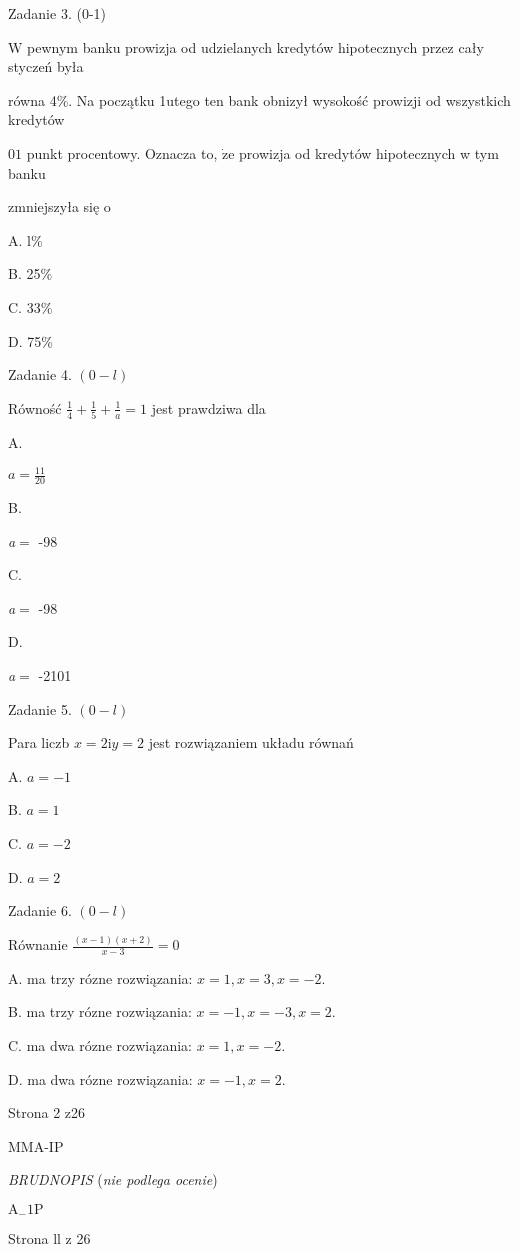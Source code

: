 \documentclass[a4paper,12pt]{article}
\begin{document}
Zadanie 3. (0-1)

$\mathrm{W}$ pewnym banku prowizja od udzielanych kredytów hipotecznych przez cały styczeń była

równa 4\%. Na początku 1utego ten bank obnizył wysokość prowizji od wszystkich kredytów

$0 1$ punkt procentowy. Oznacza to, $\dot{\mathrm{z}}\mathrm{e}$ prowizja od kredytów hipotecznych w tym banku

zmniejszyła się o

A. l\%

B. 25\%

C. 33\%

D. 75\%

Zadanie 4. $(0-l)$

Równość $\displaystyle \frac{1}{4}+\frac{1}{5}+\frac{1}{a}=1$ jest prawdziwa dla

A.

$a=\displaystyle \frac{11}{20}$

B.

{\it a}$=$ -98

C.

{\it a}$=$ -98

D.

{\it a}$=$ -2101

Zadanie 5. $(0-l)$

Para liczb $x=2 \mathrm{i}y=2$ jest rozwiązaniem układu równań 

A. $a=-1$

B. $a=1$

C. $a=-2$

D. $a=2$

Zadanie 6. $(0-l)$

Równanie $\displaystyle \frac{(x-1)(x+2)}{x-3}=0$

A. ma trzy rózne rozwiązania: $x=1, x=3, x=-2.$

B. ma trzy rózne rozwiązania: $x=-1, x=-3, x=2.$

C. ma dwa rózne rozwiązania: $x=1, x=-2.$

D. ma dwa rózne rozwiązania: $x=-1, x=2.$

Strona 2 z26

MMA-IP





{\it BRUDNOPIS} ({\it nie podlega ocenie})

$\mathrm{A}_{-}1\mathrm{P}$

Strona ll z 26
\end{document}
